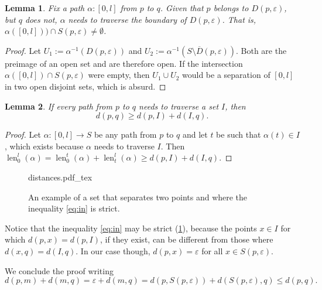 \documentclass[
	12pt, %
]{fphw}
\newcommand{\incfig}[1]{%
    \def\svgwidth{0.45\columnwidth}
    \small
        {#1.pdf_tex}
}
\newtheorem{lemma}{Lemma}
\newcommand{\clsr}[1]{\overline{#1}}
\DeclareMathOperator{\len}{len}
\begin{document}
\begin{lemma}
    Fix a path $α : [0, l]$ from $p$ to $q$.
    Given that $p$ belongs to $D(p,ε)$, but $q$ does not,
    $α$ needs to traverse the boundary of $D(p,ε)$.
    That is, $α([0, l])) \cap S(p,ε) \ne \emptyset$.
\end{lemma}

\begin{proof}
    Let $U_1 := α^{-1}(D(p,ε))$ and $U_2 := α^{-1}(S \setminus \clsr{D}(p,ε))$.
    Both are the preimage of an open set and are therefore open.
    If the intersection $α([0,l]) \cap S(p,ε)$ were empty, then $U_1 \cup U_2$
    would be a separation of $[0,l]$ in two open disjoint sets, which is absurd.
\end{proof}

\begin{lemma}
    If every path from $p$ to $q$ needs to traverse a set $I$, then
    \begin{equation}\label{eq:in}
        d(p,q) \ge d(p,I) + d(I,q).
    \end{equation}
\end{lemma}

\begin{proof}
    Let $α : [0,l] \to S$ be any path from $p$ to $q$ and
    let $t$ be such that $α(t) \in I$,
    which exists because $α$ needs to traverse $I$.
    Then $\len_0^l(α) = \len_0^{t}(α) + \len_{t}^l(α) \ge d(p, I) + d(I, q)$.
\end{proof}

\begin{figure}[hbt]
    \centering
    \hspace{0.15\columnwidth}
    \incfig{distances}
    \caption{An example of a set that separates two points and where
    the inequality \eqref{eq:in} is strict.}
    \label{fig:in}
\end{figure}

Notice that the inequality \eqref{eq:in} may be strict (\cref{fig:in}),
because the points $x \in I$ for which $d(p, x) = d(p, I)$, if they exist,
can be different from those where $d(x, q) = d(I, q)$.
In our case though, $d(p, x) = ε$ for all $x \in S(p,ε)$.

We conclude the proof writing
\begin{equation*}
    d(p, m) + d(m, q) = ε + d(m, q) = d(p, S(p,ε)) + d(S(p,ε), q) \le d(p, q).
\end{equation*}

\end{document}
